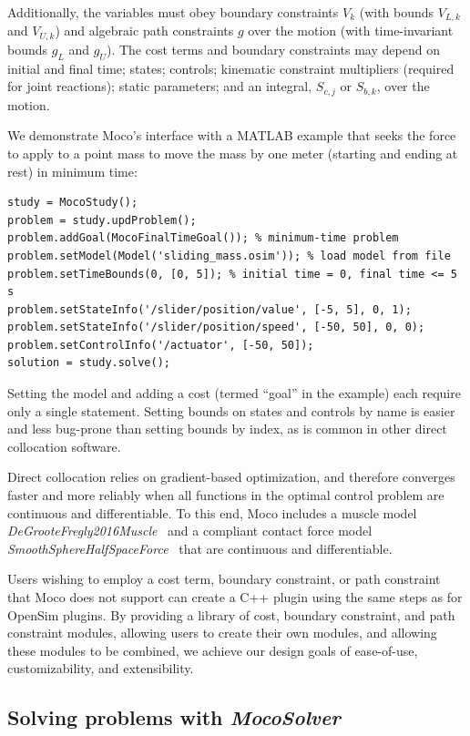 \documentclass[10pt,letterpaper]{article}
\begin{document}
Additionally, the variables must obey boundary constraints $V_k$ (with bounds $V_{L,k}$ and $V_{U,k}$) and algebraic path constraints $g$ over the motion (with time-invariant bounds $g_L$ and $g_U$). The cost terms and boundary constraints may depend on initial and final time; states; controls; kinematic constraint multipliers (required for joint reactions); static parameters; and an integral, $S_{c,j}$ or $S_{b,k}$, over the motion.

We demonstrate Moco's interface with a MATLAB example that seeks the force to apply to a point mass to move the mass by one meter (starting and ending at rest) in minimum time:
\begin{lstlisting}
study = MocoStudy();
problem = study.updProblem();
problem.addGoal(MocoFinalTimeGoal()); % minimum-time problem
problem.setModel(Model('sliding_mass.osim')); % load model from file
problem.setTimeBounds(0, [0, 5]); % initial time = 0, final time <= 5 s
problem.setStateInfo('/slider/position/value', [-5, 5], 0, 1);
problem.setStateInfo('/slider/position/speed', [-50, 50], 0, 0);
problem.setControlInfo('/actuator', [-50, 50]);
solution = study.solve();
\end{lstlisting}
Setting the model and adding a cost (termed ``goal'' in the example) each
require only a single statement. Setting bounds on states and controls by name is easier and less bug-prone than setting bounds by index, as is common in other direct collocation software.

Direct collocation relies on gradient-based optimization, and therefore converges faster and more reliably when all functions in the optimal control problem are continuous and differentiable. To this end, Moco includes a muscle model \textit{DeGrooteFregly2016Muscle}~\cite{Groote:2016dq} and a compliant contact force model \textit{SmoothSphereHalfSpaceForce}~\cite{Serrancoli:2019aa} that are continuous and differentiable.

Users wishing to employ a cost term, boundary constraint, or path constraint that Moco does not support can create a C++ plugin using the same steps as for OpenSim plugins. By providing a library of cost, boundary constraint, and path constraint modules, allowing users to create their own modules, and allowing these modules to be combined, we achieve our design goals of ease-of-use, customizability, and extensibility.


\subsection*{Solving problems with \textit{MocoSolver}}
\end{document}
